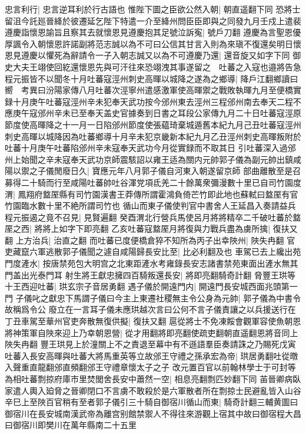 忠言利行|{
	忠言逆耳利於行古語也}
惟陛下圖之臣欲公然入朝|{
	朝直遥翻下同}
恐將士留沮今託廵晉絳於彼遷延乞陛下特遣一介至絳州問臣臣即與之同發九月壬戍上遣裴遵慶詣懷恩諭旨且察其去就懷恩見遵慶抱其足號泣訴寃|{
	號戶刀翻}
遵慶為言聖恩優厚諷令入朝懷恩許諾副將范志誠以為不可曰公信其甘言入則為來瑱不復還矣明日懷恩見遵慶以懼死為辭請令一子入朝志誠又以為不可遵慶乃還|{
	還音旋又如字下同}
御史大夫王翊使回紇還懷恩先與可汗往來恐翊洩其事遂留之　吐蕃之入寇也邉將告急程元振皆不以聞冬十月吐蕃寇涇州刺史高暉以城降之遂為之鄉導|{
	降戶江翻鄉讀曰嚮　考異曰汾陽家傳八月吐蕃次涇寧州遣感激軍使高暉禦之戰敗執暉九月至便橋實録十月庚午吐蕃寇涇州辛未犯奉天武功按今邠州東去涇州三程邠州南去奉天二程不應庚午寇邠州辛未已至奉天盖史官據奏到日書之耳段公家傳九月二十日吐蕃寇涇原節度使高暉降之十一月一日陷邠州節度使張藴琦棄城遁舊本紀九月己丑吐蕃寇涇州刺史高暉以城降因為吐蕃鄉導十月辛未犯京畿新本紀九月乙丑涇州刺史高暉叛附於吐蕃十月庚午吐蕃陷邠州辛未寇奉天武功今月從實録而不取其日}
引吐蕃深入過邠州上始聞之辛未寇奉天武功京師震駭詔以雍王适為關内元帥郭子儀為副元帥出鎮咸陽以禦之子儀閒廢日久|{
	寶應元年八月郭子儀自河東入朝遂留京師}
部曲離散至是召募得二十騎而行至咸陽吐蕃帥吐谷渾党項氐羌二十餘萬衆彌漫數十里已自司竹園度渭|{
	鳳翔府盩厔縣有司竹園漢書王莽傳所謂霍鴻負倚芒竹即此地也蘇軾曰盩厔有官竹園臨水數十里不絶所謂司竹也}
循山而東子儀使判官中書舍人王延昌入奏請益兵程元振遏之竟不召見|{
	見賢遍翻}
癸酉渭北行營兵馬使呂月將將精卒二千破吐蕃於盩厔之西|{
	將將上如字下即亮翻}
乙亥吐蕃寇盩厔月將復與力戰兵盡為虜所擒|{
	復扶又翻}
上方治兵|{
	治直之翻}
而吐蕃已度便橋倉猝不知所為丙子出幸陜州|{
	陜失冉翻}
官吏藏竄六軍逃散郭子儀聞之遽自咸陽歸長安比至|{
	比必利翻及也}
車駕已去上纔出苑門度滻水|{
	按唐禁苑包大明宫之北東距滻水考雍錄長安志諸書禁苑東面出滻水無其門盖出光泰門耳}
射生將王獻忠擁四百騎叛還長安|{
	將即亮翻騎奇計翻}
脅豐王珙等十王西迎吐蕃|{
	珙玄宗子音居勇翻}
遇子儀於開遠門内|{
	開遠門長安城西面兆頭第一門}
子儀叱之獻忠下馬謂子儀曰今主上東遷社稷無主令公身為元帥|{
	郭子儀為中書令故稱爲令公}
廢立在一言耳子儀未應珙越次言曰公何不言子儀責讓之以兵援送行在丁丑車駕至華州官吏奔散無復供擬|{
	復扶又翻}
扈從將士不免凍餒會觀軍容使魚朝恩將神策軍自陜來迎上乃幸朝恩營|{
	從才用翻將即亮翻使疏吏翻朝直遥翻恩將音同上陜失冉翻}
豐王珙見上於潼關上不之責退至幕中有不遜語羣臣奏請誅之乃賜死戊寅吐蕃入長安高暉與吐蕃大將馬重英等立故邠王守禮之孫承宏為帝|{
	珙居勇翻吐從暾入聲重直龍翻邠直頻翻邠王守禮章懷太子之子}
改元置百官以前翰林學士于可封等為相吐蕃剽掠府庫市里焚閭舍長安中蕭然一空|{
	相息亮翻剽匹妙翻下同}
苖晉卿病臥家遣人輿入廹脅之晉卿閉口不言虜不敢殺於是六軍散者所在剽掠士民避亂皆入山谷辛巳上至陜百官稍有至者郭子儀引三十騎自御宿川循山而東|{
	騎奇計翻三輔黄圖曰御宿川在長安城南漢武帝為離宫别館禁禦人不得往來游觀上宿其中故曰御宿程大昌曰御宿川即樊川在萬年縣南二十五里}
